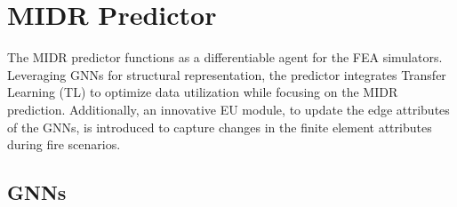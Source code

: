 \section{MIDR Predictor}
\label{sec:mdrp}
The MIDR predictor functions as a differentiable agent for the FEA simulators. Leveraging GNNs for structural representation, the predictor integrates Transfer Learning (TL) to optimize data utilization while focusing on the MIDR prediction. Additionally, an innovative EU module, to update the edge attributes of the GNNs, is introduced to capture changes in the finite element attributes during fire scenarios.

\subsection{GNNs}
\label{subsec:gnn}

